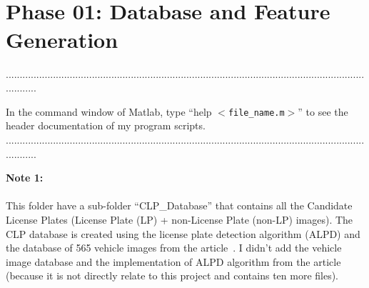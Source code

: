 \documentclass[a4paper,12pt]{article} %
\begin{document}
\pagestyle{fancy}
 \renewcommand{\headrulewidth}{1pt}
\sectionfont{\fontsize{12}{15}\selectfont}
\vspace{2cm}


\section*{\\Phase 01: Database and Feature Generation}
............................................................................................................................................

In the command window of Matlab, type ``help $<$\verb|file_name.m|$>$'' to see the header documentation of my program scripts.\\
............................................................................................................................................

\textbf{Note 1:}\\\\
This folder have a sub-folder ``CLP\_Database'' that contains all the Candidate License Plates (License Plate (LP) + non-License Plate (non-LP) images). The CLP database is created using the license plate detection algorithm (ALPD) and the database of 565 vehicle images from the article~\cite{Aza16}. I didn't add the vehicle image database and the implementation of ALPD algorithm from the article~\cite{Aza16} (because it is not directly relate to this project and contains ten more files).  
\end{document}
